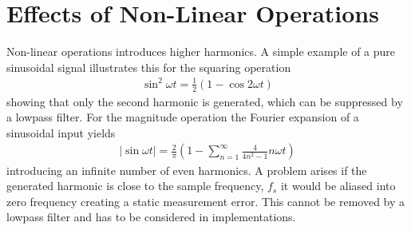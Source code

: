 \documentclass[../main2.tex]{subfiles}
\begin{document}
\section{Effects of Non-Linear Operations} \label{non_lin_ops}
Non-linear operations introduces higher harmonics. A simple example of a pure sinusoidal signal illustrates this for the squaring operation
\begin{align}
\sin^2{\omega t} = \frac{1}{2}(1-\cos{2\omega t}) 
\end{align}
showing that only the second harmonic is generated, which can be suppressed by a lowpass filter.
For the magnitude operation the Fourier expansion of a sinusoidal input yields
\begin{align}
\left |\sin{\omega t}\right | = \frac{2}{\pi}\left (1 - \sum_{n=1}^{\infty}\frac{4}{4n^2-1} n\omega t \right) 
\end{align}
introducing an infinite number of even harmonics. A problem arises if the generated harmonic is close to the sample frequency, $f_s$ it would be aliased into zero frequency creating a static measurement error. This cannot be removed by a lowpass filter and has to be considered in implementations.
\end{document}
